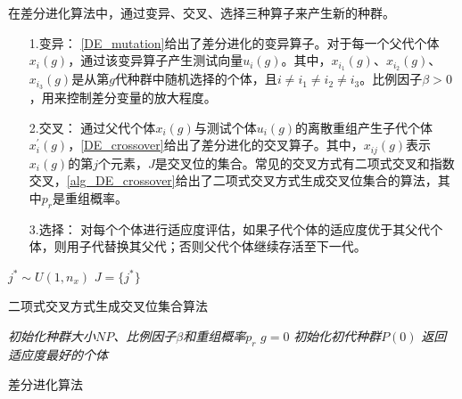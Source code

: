 在差分进化算法中，通过变异、交叉、选择三种算子来产生新的种群。
\begin{enumerate}
\item[1.变异：]\autoref{DE_mutation}给出了差分进化的变异算子。对于每一个父代个体\(x_{i}(g)\)，通过该变异算子产生测试向量\(u_{i}(g)\)。其中，\(x_{i_{1}}(g)\)、\(x_{i_{2}}(g)\)、\(x_{i_{3}}(g)\)是从第\(g\)代种群中随机选择的个体，且\(i \neq i_{1} \neq i_{2} \neq i_{3}\)。比例因子\(\beta > 0\)，用来控制差分变量的放大程度。

\item[2.交叉：]通过父代个体\(x_{i}(g)\)与测试个体\(u_{i}(g)\)的离散重组产生子代个体\(x^{'}_{i}(g)\)，\autoref{DE_crossover}给出了差分进化的交叉算子。其中，\(x_{ij}(g)\)表示\(x_{i}(g)\)的第\(j\)个元素，\(J\)是交叉位的集合。常见的交叉方式有二项式交叉和指数交叉，\autoref{alg_DE_crossover}给出了二项式交叉方式生成交叉位集合的算法，其中\(p_{r}\)是重组概率。

\item[3.选择：]对每个个体进行适应度评估，如果子代个体的适应度优于其父代个体，则用子代替换其父代；否则父代个体继续存活至下一代。

\end{enumerate}

\IncMargin{1em}
\begin{algorithm}
\emph{$j^{*}\sim U \left( 1,n_{x} \right)$}\;
\emph{$J = \{j^{*}\}$}\;
\caption{二项式交叉方式生成交叉位集合算法}\label{alg_DE_crossover}
\end{algorithm}\DecMargin{1em}

\IncMargin{1em}
\begin{algorithm}
\emph{初始化种群大小$NP$、比例因子$\beta$和重组概率$p_{r}$}\;
\emph{$g=0$}\;
\emph{初始化初代种群$P(0)$}\;
\emph{返回适应度最好的个体}\;
\caption{差分进化算法}\label{alg_DE}
\end{algorithm}\DecMargin{1em}

